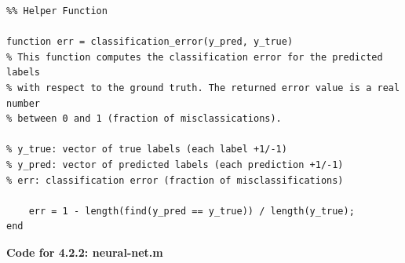 \documentclass[english]{article}
\begin{document}
\begin{verbatim}
%% Helper Function

function err = classification_error(y_pred, y_true)
% This function computes the classification error for the predicted labels
% with respect to the ground truth. The returned error value is a real number
% between 0 and 1 (fraction of misclassications).

% y_true: vector of true labels (each label +1/-1)
% y_pred: vector of predicted labels (each prediction +1/-1)
% err: classification error (fraction of misclassifications)

	err = 1 - length(find(y_pred == y_true)) / length(y_true);
end
\end{verbatim}

\color{black}

\noindent\textbf{Code for 4.2.2: neural-net.m}
\color{red}
\end{document}
